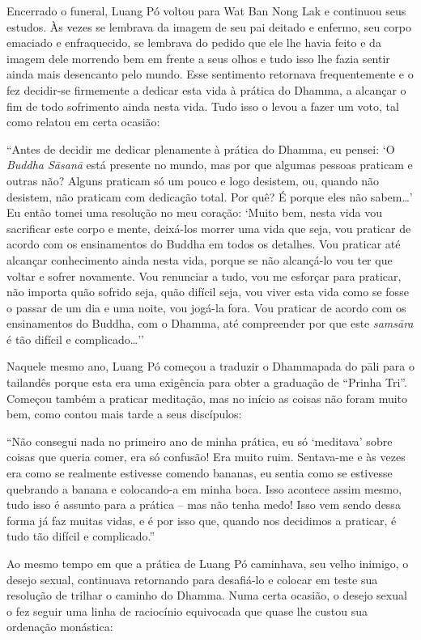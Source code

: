 Encerrado o funeral, Luang Pó voltou para Wat Ban Nong Lak e continuou
seus estudos. Às vezes se lembrava da imagem de seu pai deitado e
enfermo, seu corpo emaciado e enfraquecido, se lembrava do pedido que
ele lhe havia feito e da imagem dele morrendo bem em frente a seus olhos
e tudo isso lhe fazia sentir ainda mais desencanto pelo mundo. Esse
sentimento retornava frequentemente e o fez decidir-se firmemente a
dedicar esta vida à prática do Dhamma, a alcançar o fim de todo
sofrimento ainda nesta vida. Tudo isso o levou a fazer um voto, tal como
relatou em certa ocasião:

``Antes de decidir me dedicar plenamente à prática do Dhamma, eu pensei:
`O \emph{Buddha Sāsanā} está presente no mundo, mas por que
algumas pessoas praticam e outras não? Alguns praticam só um pouco e
logo desistem, ou, quando não desistem, não praticam com dedicação
total. Por quê? É porque eles não sabem\ldots{}' Eu então tomei uma
resolução no meu coração: `Muito bem, nesta vida vou sacrificar este
corpo e mente, deixá-los morrer uma vida que seja, vou praticar de
acordo com os ensinamentos do Buddha em todos os detalhes. Vou praticar
até alcançar conhecimento ainda nesta vida, porque se não alcançá-lo vou
ter que voltar e sofrer novamente. Vou renunciar a tudo, vou me esforçar
para praticar, não importa quão sofrido seja, quão difícil seja, vou
viver esta vida como se fosse o passar de um dia e uma noite, vou
jogá-la fora. Vou praticar de acordo com os ensinamentos do Buddha, com
o Dhamma, até compreender por que este \emph{samsāra} é tão difícil e
complicado\ldots{}''

Naquele mesmo ano, Luang Pó começou a traduzir o Dhammapada do pāli para
o tailandês porque esta era uma exigência para obter a graduação de
``Prinha Tri''. Começou também a praticar meditação, mas no início as
coisas não foram muito bem, como contou mais tarde a seus discípulos:

``Não consegui nada no primeiro ano de minha prática, eu só `meditava'
sobre coisas que queria comer, era só confusão! Era muito ruim.
Sentava-me e às vezes era como se realmente estivesse \mbox{comendo} \mbox{bananas},
eu sentia como se estivesse quebrando a banana e colocando-a em minha
boca. Isso acontece assim mesmo, tudo isso é assunto para a prática --
mas não tenha medo! Isso vem sendo dessa forma já faz muitas vidas, e é
por isso que, quando nos decidimos a praticar, é tudo tão difícil e
complicado.''

Ao mesmo tempo em que a prática de Luang Pó caminhava, seu velho
inimigo, o desejo sexual, continuava retornando para desafiá-lo e
colocar em teste sua resolução de trilhar o caminho do Dhamma. Numa
certa ocasião, o desejo sexual o fez seguir uma linha de raciocínio
equivocada que quase lhe custou sua ordenação monástica:

